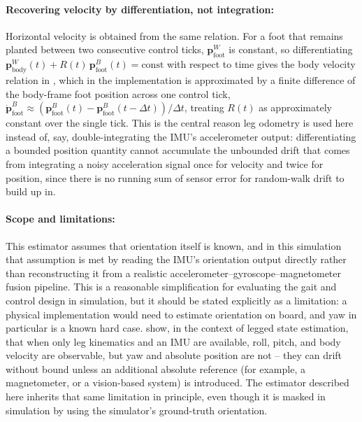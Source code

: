 \documentclass[12pt]{article}
\begin{document}
\paragraph{Recovering velocity by differentiation, not integration:} Horizontal velocity is obtained from the same relation. For a foot that remains planted between two consecutive control ticks, $\mathbf{p}^{W}_{\text{foot}}$ is constant, so differentiating $\mathbf{p}^{W}_{\text{body}}(t) + R(t)\,\mathbf{p}^{B}_{\text{foot}}(t) = \text{const}$ with respect to time gives the body velocity relation in , which in the implementation is approximated by a finite difference of the body-frame foot position across one control tick, $\dot{\mathbf{p}}^{B}_{\text{foot}} \approx (\mathbf{p}^{B}_{\text{foot}}(t) - \mathbf{p}^{B}_{\text{foot}}(t-\Delta t))/\Delta t$, treating $R(t)$ as approximately constant over the single tick. This is the central reason leg odometry is used here instead of, say, double-integrating the IMU's accelerometer output: differentiating a bounded position quantity cannot accumulate the unbounded drift that comes from integrating a noisy acceleration signal once for velocity and twice for position, since there is no running sum of sensor error for random-walk drift to build up in.

\paragraph{Scope and limitations:} This estimator assumes that orientation itself is known, and in this simulation that assumption is met by reading the IMU's orientation output directly rather than reconstructing it from a realistic accelerometer--gyroscope--magnetometer fusion pipeline. This is a reasonable simplification for evaluating the gait and control design in simulation, but it should be stated explicitly as a limitation: a physical implementation would need to estimate orientation on board, and yaw in particular is a known hard case. \citet{bloesch2012state} show, in the context of legged state estimation, that when only leg kinematics and an IMU are available, roll, pitch, and body velocity are observable, but yaw and absolute position are not -- they can drift without bound unless an additional absolute reference (for example, a magnetometer, or a vision-based system) is introduced. The estimator described here inherits that same limitation in principle, even though it is masked in simulation by using the simulator's ground-truth orientation.
\end{document}
